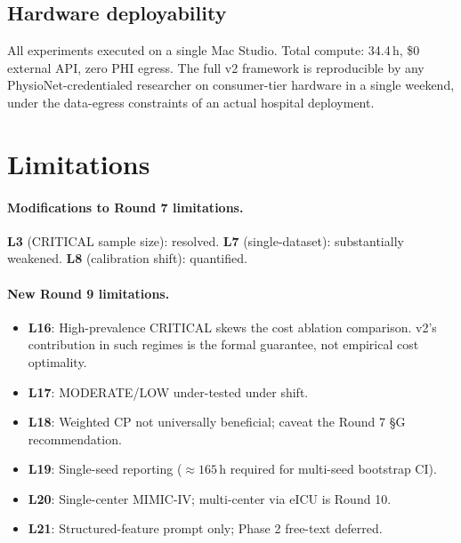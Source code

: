 \documentclass[11pt,letterpaper]{article}
\begin{document}
\subsection{Hardware deployability}
All experiments executed on a single Mac Studio. Total compute: 34.4\,h,
\$0 external API, zero PHI egress. The full v2 framework is reproducible
by any PhysioNet-credentialed researcher on consumer-tier hardware in a
single weekend, under the data-egress constraints of an actual hospital
deployment.

\section{Limitations}

\paragraph{Modifications to Round 7 limitations.}
\textbf{L3} (CRITICAL sample size): resolved. \textbf{L7}
(single-dataset): substantially weakened. \textbf{L8} (calibration
shift): quantified.

\paragraph{New Round 9 limitations.}
\begin{itemize}[leftmargin=*,itemsep=2pt]
\item \textbf{L16}: High-prevalence CRITICAL skews the cost ablation
comparison. v2's contribution in such regimes is the formal guarantee, not
empirical cost optimality.
\item \textbf{L17}: MODERATE/LOW under-tested under shift.
\item \textbf{L18}: Weighted CP \cite{Tibshirani2019} not universally
beneficial; caveat the Round 7 \S{}G recommendation.
\item \textbf{L19}: Single-seed reporting ($\approx 165$\,h required for
multi-seed bootstrap CI).
\item \textbf{L20}: Single-center MIMIC-IV; multi-center via
eICU \cite{Pollard2018eICU} is Round 10.
\item \textbf{L21}: Structured-feature prompt only; Phase 2 free-text
deferred.
\end{itemize}

\end{document}
